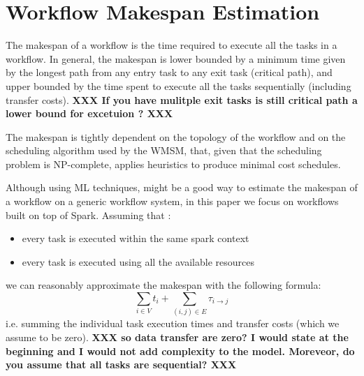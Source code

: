 \documentclass[a4paper, 10pt, conference]{ieeeconf}      %
\begin{document}
\section{Workflow Makespan Estimation}
\label{section:overall}

The makespan of a workflow is the time required to execute all the tasks in a workflow. In general, the makespan is lower bounded by a minimum time given by the longest path from any entry task to any exit task (critical path), and upper bounded by the time spent to execute all the tasks sequentially (including transfer costs). \textbf{XXX If you have mulitple exit tasks is still critical path a lower bound for excetuion ? XXX}

The  makespan is tightly dependent on the topology of the workflow and on the scheduling algorithm used by the WMSM, that, given that the scheduling problem is NP-complete, applies heuristics to produce minimal cost schedules.

Although using ML techniques, might be a good way to estimate the makespan of a workflow on a generic workflow system, in this paper we focus on workflows built on top of Spark. Assuming that :
\begin{itemize}
\item every task is executed within the same spark context
\item every task is executed using all the available resources
\end{itemize}
we can reasonably approximate the makespan with the following formula:
$$ \sum_{i\in V} t_i + \sum_{(i,j) \in E} \tau_{i\rightarrow j}$$
i.e. summing the individual task execution times and transfer costs (which we assume to be zero).  \textbf{XXX so data transfer are zero? I would state at the beginning and I would not add complexity to the model.  Moreveor, do you assume that all tasks are sequential? XXX}


\end{document}
